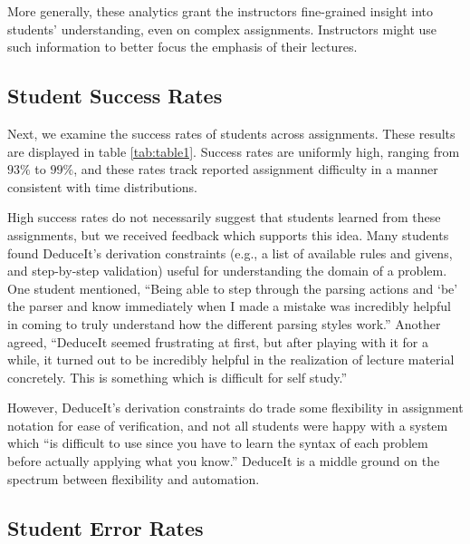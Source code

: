 \documentclass{sigchi}
\newcommand{\msb}[1]{\textbf{\textcolor{cyan}{Michael: #1}}}
\begin{document}
More generally, these analytics grant the instructors fine-grained insight into students' understanding, even on complex assignments. Instructors might use such information to better focus the emphasis of their lectures.

\subsection{Student Success Rates}

Next, we examine the success rates of students across assignments. These results are displayed in table \ref{tab:table1}. Success rates are uniformly high, ranging from $93\%$ to $99\%$, and these rates track reported assignment difficulty in a manner consistent with time distributions. %

High success rates do not necessarily suggest that students learned from these assignments, but we received feedback which supports this idea. Many students found DeduceIt's derivation constraints (e.g., a list of available rules and givens, and step-by-step validation) useful for understanding the domain of a problem. One student mentioned, ``Being able to step through the parsing actions and `be' the parser and know immediately when I made a mistake was incredibly helpful in coming to truly understand how the different parsing styles work.'' Another agreed, ``DeduceIt seemed frustrating at first, but after playing with it for a while, it turned out to be incredibly helpful in the realization of lecture material concretely. This is something which is difficult for self study.''

However, DeduceIt's derivation constraints do trade some flexibility in assignment notation for ease of verification, and not all students were happy with a system which ``is difficult to use since you have to learn the syntax of each problem before actually applying what you know.'' DeduceIt is a middle ground on the spectrum between flexibility and automation.  

\subsection{Student Error Rates}
\end{document}
